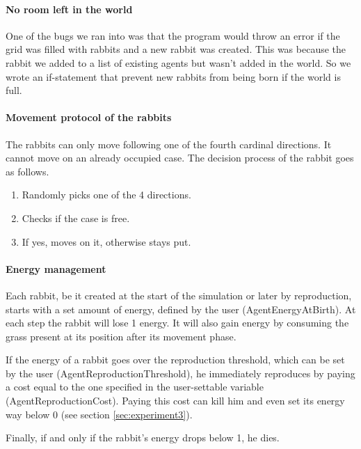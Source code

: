 \documentclass[11pt]{article}
\begin{document}
\paragraph{No room left in the world}One of the bugs we ran into was that the program would throw an error if the grid was filled with rabbits and a new rabbit was created. This was because the rabbit we added to a list of existing agents but wasn't added in the world. So we wrote an if-statement that prevent new rabbits from being born if the world is full.

\paragraph{Movement protocol of the rabbits} The rabbits can only move following one of the fourth cardinal directions. It cannot move on an already occupied case. The decision process of the rabbit goes as follows.

\begin{enumerate}
  \item Randomly picks one of the 4 directions.
  \item Checks if the case is free.
  \item If yes, moves on it, otherwise stays put.
\end{enumerate}

\paragraph{Energy management} Each rabbit, be it created at the start of the simulation or later by reproduction, starts with a set amount of energy, defined by the user (AgentEnergyAtBirth). At each step the rabbit will lose 1 energy. It will also gain energy by consuming the grass present at its position after its movement phase.%

If the energy of a rabbit goes over the reproduction threshold, which can be set by the user (AgentReproductionThreshold), he immediately reproduces by paying a cost equal to the one specified in the user-settable variable (AgentReproductionCost). Paying this cost can kill him and even set its energy way below 0 (see section \ref{sec:experiment3}).

Finally, if and only if the rabbit's energy drops below 1, he dies. 
\end{document}
